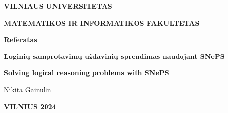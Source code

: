 \documentclass{article}
\begin{document}
\newlength{\mywidth}
\settowidth{\mywidth}{Darbo vadovas:}
\begin{titlepage}
    \vskip 20pt
    \centerline{\bf \large VILNIAUS UNIVERSITETAS}
    \bigskip
    \centerline{\large \textbf{MATEMATIKOS IR INFORMATIKOS FAKULTETAS}}
    \vskip 120pt
    \centerline{\bf \Large \textbf{Referatas}}
    \vskip 50pt
    \begin{center}
        {\bf \LARGE Loginių samprotavimų uždavinių sprendimas
            naudojant SNePS}
    \end{center}
    \bigskip
    \begin{center}
        {\bf \Large Solving logical reasoning problems with SNePS}
    \end{center}
    \bigskip
    \centerline{\Large Nikita Gainulin}
    \vskip 90pt
    \vskip 60pt
    \vskip 73pt
    \centerline{\large \textbf{VILNIUS 2024}}
\end{titlepage}

\tableofcontents

\clearpage
\end{document}
